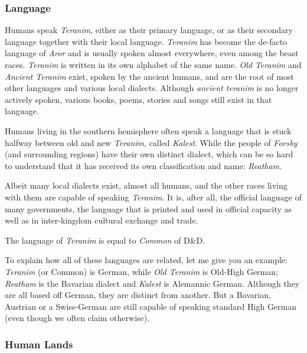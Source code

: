 \subsubsection*{Language}

Humans speak \emph{Teranim}, either as their primary language, or as their
secondary language together with their local language. \emph{Teranim} has
become the de-facto language of \emph{Aror} and is usually spoken almost
everywhere, even among the beast races. \emph{Teranim} is written in its own
alphabet of the same name. \emph{Old Teranim} and \emph{Ancient Teranim} exist,
spoken by the ancient humans, and are the root of most other languages and
various local dialects. Although \emph{ancient teranim} is no longer actively
spoken, various books, poems, stories and songs still exist in that language.

Humans living in the southern hemisphere often speak a language that is
stuck halfway between old and new \emph{Teranim}, called \emph{Kalest}. While
the people of \emph{Forsby} (and surrounding regions) have their own distinct
dialect, which can be so hard to understand that it has received its own
classification and name: \emph{Reatham}.

Albeit many local dialects exist, almost all humans, and the other races
living with them are capable of speaking \emph{Teranim}. It is, after all,
the official language of many governments, the language that is printed and
used in official capacity as well as in inter-kingdom cultural exchange and
trade.

\begin{35e}
The language of \emph{Teranim} is equal to \emph{Common} of D\&D.
\end{35e}

\begin{note}
To explain how all of these languages are related, let me give you an example:
\emph{Teranim} (or Common) is German, while \emph{Old Teranim} is Old-High
German; \emph{Reatham} is the Bavarian dialect and \emph{Kalest} is Alemannic
German. Although they are all based off German, they are distinct from
another. But a Bavarian, Austrian or a Swiss-German are still capable of
speaking standard High German (even though we often claim otherwise).
\end{note}

\subsubsection*{Human Lands}

